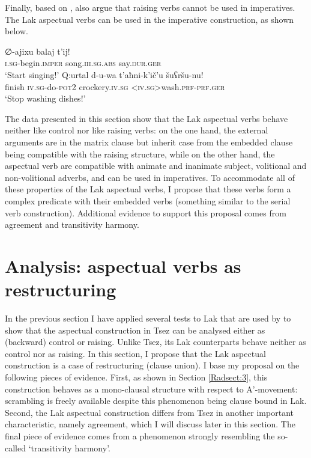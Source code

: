 \documentclass[output=paper]{langscibook}
\begin{document}
Finally, based on \citet{Farkas1988}, \cite{PolinskyPotsdam2002} also argue that raising verbs cannot be used in imperatives. The Lak aspectual verbs can be used in the imperative construction, as shown below.

\ea\label{Rad46}
\gll ∅-ajixu balaj t’ij!\\
\textsc{i.sg}-begin.\textsc{imper} song.\textsc{iii.sg.abs} say.\textsc{dur.ger}\\
\glt ‘Start singing!’
\ex\label{Rad47}
\gll Q:urtal d-u-wa t’aħni-k’ič’u šuʕršu-nu!\\
finish \textsc{iv.sg}-do-\textsc{pot2}	crockery.\textsc{iv.sg}	\textsc{<iv.sg>}wash.\textsc{prf-prf.ger}\\
\glt ‘Stop washing dishes!’
\z 

The data presented in this section show that the Lak aspectual verbs behave neither like control nor like raising verbs: on the one hand, the external arguments are in the matrix clause but inherit case from the embedded clause being compatible with the raising structure, while on the other hand, the aspectual verb are compatible with animate and inanimate subject, volitional and non-volitional adverbs, and can be used in imperatives. To accommodate all of these properties of the Lak aspectual verbs, I propose that these verbs form a complex predicate with their embedded verbs (something similar to the serial verb construction). Additional evidence to support this proposal comes from agreement and transitivity harmony.

\section{Analysis: aspectual verbs as restructuring}
In the previous section I have applied several tests to Lak that are used by \citet{PolinskyPotsdam2002} to show that the aspectual construction in Tsez can be analysed either as (backward) control or raising. Unlike Tsez, its Lak counterparts behave neither as control nor as raising. In this section, I propose that the Lak aspectual construction is a case of restructuring (clause union). I base my proposal on the following pieces of evidence. First, as shown in Section \ref{Radsect:3}, this construction behaves as a mono-clausal structure with respect to A'-movement: scrambling is freely available despite this phenomenon being clause bound in Lak. Second, the Lak aspectual construction differs from Tsez in another important characteristic, namely agreement, which I will discuss later in this section. The final piece of evidence comes from a phenomenon strongly resembling the so-called ‘transitivity harmony’.
\end{document}
